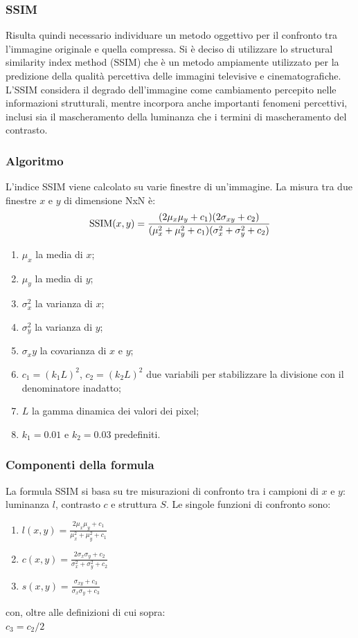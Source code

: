 \documentclass[a4paper,11pt]{article}
\begin{document}
    \subsubsection{SSIM}
    Risulta quindi necessario individuare un metodo oggettivo per il confronto tra l'immagine originale e quella compressa. 
    Si è deciso di utilizzare lo structural similarity index method (SSIM) che è un metodo ampiamente utilizzato per la predizione della qualità percettiva delle immagini televisive e cinematografiche.
    L'SSIM considera il degrado dell'immagine come cambiamento percepito nelle informazioni strutturali, mentre incorpora anche importanti fenomeni percettivi, inclusi sia il mascheramento della luminanza che i termini di mascheramento del contrasto. 
    \subsubsection{Algoritmo}
    L'indice SSIM viene calcolato su varie finestre di un'immagine. La misura tra due finestre $x$ e $y$ di dimensione NxN è: \\[0.2in]
        $$\hbox{SSIM}(x,y) = \frac{(2\mu_x\mu_y + c_1)(2\sigma_{xy} + c_2)}{(\mu_x^2 + \mu_y^2 + c_1)(\sigma_x^2 + \sigma_y^2 + c_2)}$$
    \begin{enumerate} 
        \item $\mu_x$ la media di $x$;
        \item $\mu_y$ la media di $y$;
        \item $\sigma_x^2$ la varianza di $x$;
        \item $\sigma_y^2$ la varianza di $y$;
        \item $\sigma_xy$ la covarianza di $x$ e $y$;
        \item $c_1=(k_1L)^2$, $c_2=(k_2L)^2$ due variabili per stabilizzare la divisione con il denominatore inadatto;
        \item $L$ la gamma dinamica dei valori dei pixel;
        \item $k_1=0.01$ e $k_2=0.03$ predefiniti.
   \end{enumerate}

   \newpage

    \subsubsection{Componenti della formula}
    La formula SSIM si basa su tre misurazioni di confronto tra i campioni di $x$ e $y$: luminanza $l$, contrasto $c$ e struttura $S$. Le singole funzioni di confronto sono:
    \begin{enumerate} 
        \item $l(x,y)=\frac{2\mu_x\mu_y + c_1}{\mu^2_x + \mu^2_y + c_1}$
        \item $c(x,y)=\frac{2\sigma_x\sigma_y + c_2}{\sigma^2_x + \sigma^2_y + c_2}$
        \item $s(x,y)=\frac{\sigma_{xy} + c_3}{\sigma_x \sigma_y + c_3}$
    \end{enumerate}
    con, oltre alle definizioni di cui sopra:\\
    $c_3 = c_2 / 2$ \\
\end{document}
